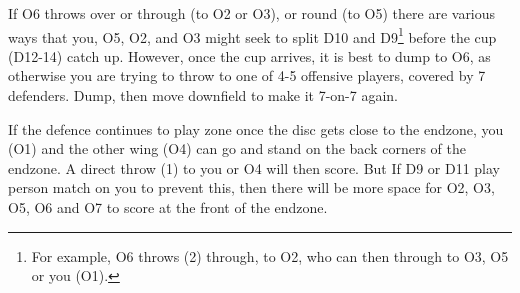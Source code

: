 \documentclass{tufte-handout}
\begin{document}
If O6 throws
over or through (to O2 or O3), 
or round (to O5) 
there are various ways 
that you, 
O5, 
O2, and
O3 
might seek to split
D10
and D9\footnote{
For example, 
O6 throws (2) through, 
to O2, 
who can then through to 
O3, 
O5 
or you (O1).}
before the cup 
(D12-14) catch up. 
However, 
once the cup arrives, 
it is best to dump to O6, 
as otherwise 
you are trying to throw to 
one of 4-5 offensive players, 
covered by 7 defenders. 
Dump, 
then move downfield 
to make it 7-on-7 again.

If the defence 
continues to play zone 
once the disc 
gets close to the endzone, 
you (O1) 
and the other wing (O4) 
can go and stand 
on the back corners 
of the endzone.  
A direct throw (1) 
to you or O4 will then score. 
But If D9 
or D11 
play person match 
on you 
to prevent this, 
then there will be
more space for O2, 
O3, 
O5, 
O6 and
O7 
to score 
at the front of the endzone. 
\end{document}
